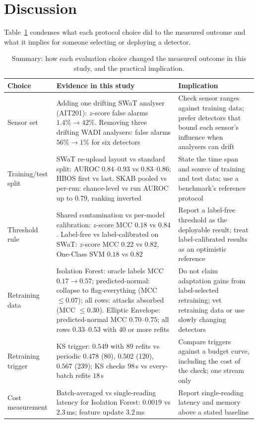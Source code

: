 \documentclass[11pt]{article}
\begin{document}
\section{Discussion}
\label{sec:discussion}

Table~\ref{tab:synth} condenses what each protocol choice did to the measured outcome
and what it implies for someone selecting or deploying a detector.

\begin{table}[t]
\centering\small
\caption{Summary: how each evaluation choice changed the measured outcome in this study,
and the practical implication.}
\label{tab:synth}
\begin{tabular}{p{}p{}p{}}
\toprule
Choice & Evidence in this study & Implication \\
\midrule
Sensor set & Adding one drifting SWaT analyser (AIT201): $z$-score false alarms $1.4\%\to42\%$. Removing three drifting WADI analysers: false alarms $56\%\to1\%$ for six detectors & Check sensor ranges against training data; prefer detectors that bound each sensor's influence when analysers can drift \\
Training/test split & SWaT re-upload layout vs standard split: AUROC $0.84$--$0.93$ vs $0.83$--$0.86$; HBOS first vs last. SKAB pooled vs per-run: chance-level vs run AUROC up to $0.79$, ranking inverted & State the time span and source of training and test data; use a benchmark's reference protocol \\
Threshold rule & Shared contamination vs per-model calibration: $z$-score MCC $0.18$ vs $0.84$. Label-free vs label-calibrated on SWaT: $z$-score MCC $0.22$ vs $0.82$, One-Class SVM $0.18$ vs $0.82$ & Report a label-free threshold as the deployable result; treat label-calibrated results as an optimistic reference \\
Retraining data & Isolation Forest: oracle labels MCC $0.17\to0.57$; predicted-normal: collapse to flag-everything (MCC $\le0.07$); all rows: attacks absorbed (MCC $\le0.30$). Elliptic Envelope: predicted-normal MCC $0.70$--$0.75$; all rows $0.33$--$0.53$ with 40 or more refits & Do not claim adaptation gains from label-selected retraining; vet retraining data or use slowly changing detectors \\
Retraining trigger & KS trigger: $0.549$ with 89 refits vs periodic $0.478$ (80), $0.502$ (120), $0.567$ (239); KS checks $98$\,s vs every-batch refits $18$\,s & Compare triggers against a budget curve, including the cost of the check; one stream only \\
Cost measurement & Batch-averaged vs single-reading latency for Isolation Forest: $0.0019$ vs $2.3$\,ms; feature update $3.2$\,ms & Report single-reading latency and memory above a stated baseline \\
\bottomrule
\end{tabular}
\end{table}
\end{document}

